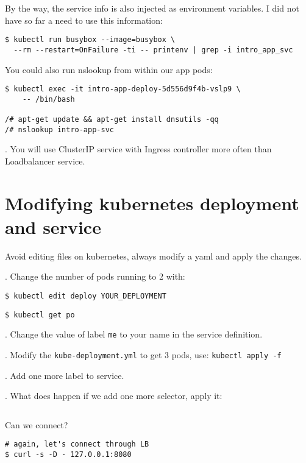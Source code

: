 \documentclass[12pt, letterpaper]{article}
\begin{document}
By the way, the service info is also injected as environment variables. I did not have so far a need to use this information:%
\begin{verbatim}
$ kubectl run busybox --image=busybox \
  --rm --restart=OnFailure -ti -- printenv | grep -i intro_app_svc
\end{verbatim}%

You could also run nslookup from within our app pods:%
\begin{verbatim}
$ kubectl exec -it intro-app-deploy-5d556d9f4b-vslp9 \
    -- /bin/bash

/# apt-get update && apt-get install dnsutils -qq
/# nslookup intro-app-svc
\end{verbatim}%

. You will use ClusterIP service with Ingress controller more often than Loadbalancer service.

%
\section{Modifying kubernetes deployment and service}

Avoid editing files on kubernetes, always modify a yaml and apply the changes.

. Change the number of pods running to 2 with:

\begin{verbatim}
$ kubectl edit deploy YOUR_DEPLOYMENT
\end{verbatim}

\begin{verbatim}
$ kubectl get po
\end{verbatim}

. Change the value of label \verb|me| to your name in the service definition.

. Modify the \verb|kube-deployment.yml| to get 3 pods, use: \texttt{kubectl apply -f}

. Add one more label to service.

. What does happen if we add one more selector, apply it:

\inputminted{yaml}{manifests/exercise-broke-svc/kube-service-broke.yml}

Can we connect?

\begin{verbatim}
# again, let's connect through LB
$ curl -s -D - 127.0.0.1:8080

\end{verbatim}
\end{document}
